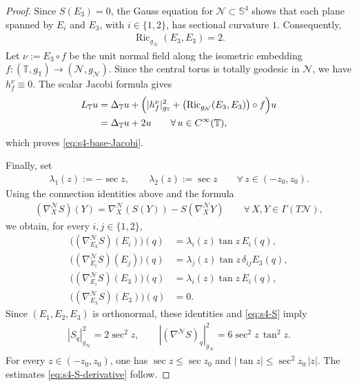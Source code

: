 \documentclass[a4paper,11pt,oneside,reqno]{amsart}
\numberwithin{equation}{section}
\theoremstyle{definition}
\begin{document}
\begin{proof}
    Since $S(E_3)=0$, the Gauss equation for
    $\mathcal{N}\subset\mathbb{S}^4$ shows that
    each plane spanned by $E_i$ and $E_3$,
    with $i\in\{1,2\}$, has sectional curvature $1$.
    Consequently,
    \begin{align*}
        \operatorname{Ric}_{g_{\mathcal{N}}}(E_3,E_3)=2.
    \end{align*}
    Let $\nu:=E_3\circ f$ be the unit normal field along
    the isometric embedding
    $f:(\mathbb{T},g_{\mathbb{T}})\to(\mathcal{N},g_{\mathcal{N}})$.
    Since the central torus is totally geodesic in $\mathcal{N}$,
    we have $h_f^\nu\equiv0$. The scalar Jacobi formula gives
    \begin{align*}
        L_{\mathbb{T}}u
        &=\Delta_{\mathbb{T}}u+
        \Bigl(
        |h_f^\nu|_{g_{\mathbb{T}}}^2
        +\bigl(\operatorname{Ric}_{g_{\mathcal{N}}}(E_3,E_3)\bigr)
        \circ f
        \Bigr)u\\
        &=\Delta_{\mathbb{T}}u+2u
        \qquad\forall\,u\in C^\infty(\mathbb{T}),
    \end{align*}
    which proves \eqref{eq:s4-base-Jacobi}.

    Finally, set
    \begin{align*}
        \lambda_1(z):=-\sec z,
        \qquad
        \lambda_2(z):=\sec z
        \qquad\forall\,z\in(-z_0,z_0).
    \end{align*}
    Using the connection identities above and the
    formula
    \begin{align*}
        (\nabla^{\mathcal{N}}_X S)(Y)
        =
        \nabla^{\mathcal{N}}_X(S(Y))
        -S(\nabla^{\mathcal{N}}_X Y)
        \qquad\forall\,X,Y\in\Gamma(T\mathcal{N}),
    \end{align*}
    we obtain, for every $i,j\in\{1,2\}$,
    \begin{align*}
        \bigl((\nabla^{\mathcal{N}}_{E_3}S)(E_i)\bigr)(q)
        &=\lambda_i(z)\tan z\,E_i(q),\\
        \bigl((\nabla^{\mathcal{N}}_{E_i}S)(E_j)\bigr)(q)
        &=\lambda_j(z)\tan z\,\delta_{ij}E_3(q),\\
        \bigl((\nabla^{\mathcal{N}}_{E_i}S)(E_3)\bigr)(q)
        &=\lambda_i(z)\tan z\,E_i(q),\\
        \bigl((\nabla^{\mathcal{N}}_{E_3}S)(E_3)\bigr)(q)
        &=0.
    \end{align*}
    Since $(E_1,E_2,E_3)$ is orthonormal, these identities
    and \eqref{eq:s4-S} imply
    \begin{align*}
        |S_q|_{g_{\mathcal{N}}}^2=2\sec^2z,
        \qquad
        |(\nabla^{\mathcal{N}}S)_q|_{g_{\mathcal{N}}}^2
        =6\sec^2z\,\tan^2z.
    \end{align*}
    For every $z\in(-z_0,z_0)$, one has
    $\sec z\leq\sec z_0$ and
    $|\tan z|\leq\sec^2z_0\,|z|$.
    The estimates \eqref{eq:s4-S-derivative} follow.
\end{proof}
\end{document}
